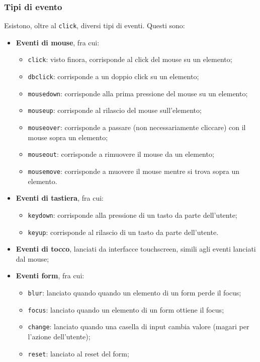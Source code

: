 \documentclass[a4paper,11pt]{article}
\begin{document}
\subsubsection{Tipi di evento}
Esistono, oltre al \lstinline|click|, diversi tipi di eventi.
Questi sono:
\begin{itemize}
	\item \textbf{Eventi di mouse}, fra cui:
		\begin{itemize}
			\item \lstinline|click|: visto finora, corrisponde al click del mouse su un elemento;
			\item \lstinline|dbclick|: corrisponde a un doppio click su un elemento;
			\item \lstinline|mousedown|: corrisponde alla prima pressione del mouse su un elemento;
			\item \lstinline|mouseup|: corrisponde al rilascio del mouse sull'elemento;
			\item \lstinline|mouseover|: corrisponde a passare (non necessariamente cliccare) con il mouse sopra un elemento;
			\item \lstinline|mouseout|: corrisponde a rimuovere il mouse da un elemento;
			\item \lstinline|mousemove|: corrisponde a muovere il mouse mentre si trova sopra un elemento.
		\end{itemize}
	\item \textbf{Eventi di tastiera}, fra cui:
		\begin{itemize}
			\item \lstinline|keydown|: corrisponde alla pressione di un tasto da parte dell'utente;
			\item \lstinline|keyup|: corrisponde al rilascio di un tasto da parte dell'utente.
		\end{itemize}
	\item \textbf{Eventi di tocco}, lanciati da interfacce touchscreen, simili agli eventi lanciati dal mouse;
	\item \textbf{Eventi form}, fra cui:
		\begin{itemize}
			\item \lstinline|blur|: lanciato quando quando un elemento di un form perde il focus;
			\item \lstinline|focus|: lanciato quando un elemento di un form ottiene il focus;
			\item \lstinline|change|: lanciato quando una casella di input cambia valore (magari per l'azione dell'utente);
			\item \lstinline|reset|: lanciato al reset del form;

\end{itemize}
\end{itemize}
\end{document}
